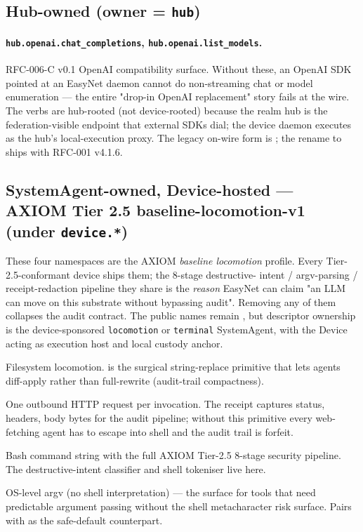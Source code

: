 \documentclass[10pt,a4paper]{article}
\newcommand{\code}[1]{\texttt{\small #1}}
\begin{document}
\subsection{Hub-owned (owner = \code{hub})}

\paragraph{\texttt{\small hub.openai.chat\_completions}, \texttt{\small hub.openai.list\_models}.}
RFC-006-C v0.1 OpenAI compatibility surface. Without these, an OpenAI
SDK pointed at an EasyNet daemon cannot do non-streaming chat or model
enumeration --- the entire "drop-in OpenAI replacement" story fails at
the wire. The verbs are hub-rooted (not device-rooted) because the
realm hub is the federation-visible endpoint that external SDKs dial;
the device daemon executes as the hub's local-execution proxy. The
legacy on-wire form is ; the rename to
 ships with RFC-001 v4.1.6.

\subsection{SystemAgent-owned, Device-hosted --- AXIOM Tier 2.5 baseline-locomotion-v1 (under \texttt{\small device.*})}

These four namespaces are the AXIOM \emph{baseline locomotion} profile.
Every Tier-2.5-conformant device ships them; the 8-stage destructive-
intent / argv-parsing / receipt-redaction pipeline they share is the
\emph{reason} EasyNet can claim "an LLM can move on this substrate
without bypassing audit". Removing any of them collapses the audit
contract.
The public names remain , but descriptor ownership is the
device-sponsored \code{locomotion} or \code{terminal} SystemAgent, with the
Device acting as execution host and local custody anchor.

\begin{description}[leftmargin=1.4em,style=nextline,itemsep=0.15em]
  \item[\codew{fs.edit}, \codew{fs.list}, \codew{fs.read}, \codew{fs.write}]
  Filesystem locomotion.  is the surgical
  string-replace primitive that lets agents diff-apply rather than
  full-rewrite (audit-trail compactness).
  \item[\codew{http.request}] One outbound HTTP request per
  invocation. The receipt captures status, headers, body bytes for
  the audit pipeline; without this primitive every web-fetching
  agent has to escape into shell and the audit trail is forfeit.
  \item[\codew{shell.run}] Bash command string with the full
  AXIOM Tier-2.5 8-stage security pipeline. The destructive-intent
  classifier and shell tokeniser live here.
  \item[\codew{process.exec}] OS-level argv (no shell interpretation)
  --- the surface for tools that need predictable argument passing
  without the shell metacharacter risk surface. Pairs with
   as the safe-default counterpart.
\end{description}
\end{document}
